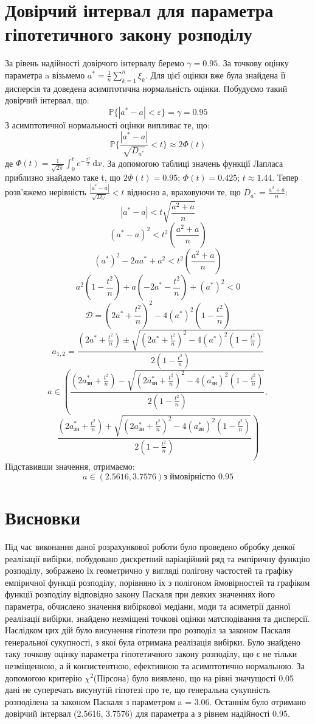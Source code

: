 \documentclass{article}
\begin{document}
\section{Довірчий інтервал для параметра гіпотетичного закону 
розподілу}
За рівень надійності довірчого інтервалу беремо $\gamma = 0.95$.
За точкову оцінку параметра a візьмемо $a^* = \frac{1}{n}
\sum_{k=1}^n \xi_k$. Для цієї оцінки вже була знайдена її дисперсія 
та доведена асимптотична нормальність оцінки. 
\newline
Побудуємо такий довірчий інтервал, що:
$$\mathbb{P} \{|a^* - a| < \varepsilon \} = \gamma = 0.95$$ 
З асимптотичної нормальності оцінки випливає те, що:
$$\mathbb{P}\{\frac{|a^* - a|}{\sqrt{D_{a^*}}} < t \} \approx 
2\Phi(t)$$
де $\Phi(t) = \frac{1}{\sqrt{2\pi}}\int_{0}^{t} e^{-\frac{x^2}{2}} \,\mathrm{d}x $.
За допомогою таблиці значень функції Лапласа приблизно 
знайдемо таке t, що $2\Phi(t) = 0.95$; $\Phi(t) = 0.425$;
$t \approx 1.44$.
\newline
Тепер розв'яжемо нерівність $\frac{|a^* - a|}{\sqrt{D_{a^*}}} < t$ 
відносно а, враховуючи те, що $D_{a^*} = \frac{a^2 + a}{n}$:
$$|a^* - a| < t\sqrt{\frac{a^2 + a}{n}}$$
$$(a^* - a)^2 < t^2(\frac{a^2 + a}{n})$$
$$(a^*)^2 - 2aa^* + a^2 < t^2(\frac{a^2 + a}{n})$$
$$a^2(1 - \frac{t^2}{n}) + a(-2a^* - \frac{t^2}{n}) + (a^*)^2 < 0$$
$$\mathcal{D} = (2a^* + \frac{t^2}{n})^2 - 4(a^*)^2(1 - \frac{t^2}{n})$$
$$a_{1,2} = \frac{(2a^* + \frac{t^2}{n}) \pm 
\sqrt{(2a^* + \frac{t^2}{n})^2 - 4(a^*)^2(1 - \frac{t^2}{n})}}
{2(1 - \frac{t^2}{n})}$$
$$a \in \left(\frac{(2a^*_{\text{зн}} + \frac{t^2}{n}) - 
\sqrt{(2a^*_{\text{зн}} + \frac{t^2}{n})^2 - 4(a^*_{\text{зн}})^2(1 - \frac{t^2}{n})}}
{2(1 - \frac{t^2}{n})}, \right.$$
$$\left.\frac{(2a^*_{\text{зн}} + \frac{t^2}{n}) + 
\sqrt{(2a^*_{\text{зн}} + \frac{t^2}{n})^2 - 4(a^*_{\text{зн}})^2(1 - \frac{t^2}{n})}}
{2(1 - \frac{t^2}{n})}\right)$$
Підставивши значення, отримаємо:
$$a \in \left(2.5616, 3.7576\right) \text{з ймовірністю }0.95$$
\newpage
\section{Висновки}
Під час виконання даної розрахункової роботи було проведено обробку 
деякої реалізації вибірки, побудовано дискретний варіаційний ряд 
та емпіричну функцію розподілу, зображено їх геометрично у вигляді 
полігону частостей та графіку емпіричної функції розподілу, 
порівняно їх з полігоном ймовірностей та графіком функції розподілу 
відповідно закону Паскаля при деяких значеннях його параметра, 
обчислено значення вибіркової медіани, моди та асиметрії данної 
реалізації вибірки, знайдено незміщені точкові оцінки матсподівання 
та дисперсії. Наслідком цих дій було висунення гіпотези про розподіл 
за законом Паскаля генеральної сукупності, з якої була отримана 
реалізація вибірки. Було знайдено таку точкову оцінку параметра 
гіпотетичного закону розподілу, що є не тільки незміщенною, а й 
конзистентною, ефективною та асимптотично нормальною. За допомогою критерію 
$\chi^2$(Пірсона) було виявлено, що на рівні значущості 0.05 дані не 
суперечать висунутій гіпотезі про те, що генеральна сукупність 
розподілена за законом Паскаля з параметром a = 3.06. Останнім було 
отримано довірчий інтервал (2.5616, 3.7576) для параметра а 
з рівнем надійності 0.95.
\end{document}
